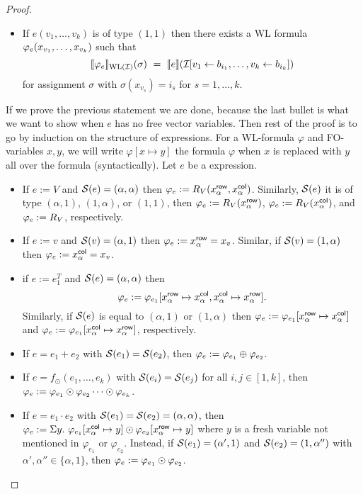 \begin{proof}
\begin{itemize}
	\item If $e(v_1,\ldots,v_k)$ is of type $(1,1)$ then there exists a WL formula $\varphi_e( x_{v_1}, \ldots, x_{v_k})$ such that
	$$
	\ssem{\varphie}{\text{WL}(\I)}(\sigma) \ = \ \sem{e}{\I[v_1\gets b_{i_1},\ldots,v_k\gets b_{i_k}]}
	$$
	for assignment $\sigma$ with $\sigma(x_{v_s})=i_s$ for $s=1,\ldots, k$.
\end{itemize}
If we prove the previous statement we are done, because the last bullet is what we want to show when $e$ has no free vector variables. 
Then rest of the proof is to go by induction on the structure of \langprod expressions.
For a WL-formula $\varphi$ and FO-variables $x,y$, we will write  $\varphi[x \mapsto y]$ the formula $\varphi$ when $x$ is replaced with $y$ all over the formula (syntactically).
Let $e$ be a \langprod expression.
\begin{itemize} \itemsep3mm
  \item If $e:=V$ and $\mathcal{S}(e)= (\alpha, \alpha)$ then $\varphi_e:=R_V(x_{\alpha}^{\mathsf{row}}, x_{\alpha}^{\mathsf{col}})$. Similarly, $\mathcal{S}(e)$ it is of type $(\alpha,1)$, $(1, \alpha)$, or $(1,1)$, then $\varphi_e:=R_V(x_{\alpha}^{\mathsf{row}})$, $\varphi_e:=R_V(x_{\alpha}^{\mathsf{col}})$, and $\varphi_e:=R_V$, respectively.
  
  \item If $e:=v$ and $\mathcal{S}(v)= (\alpha,1)$ then $\varphi_e := x_{\alpha}^{\mathsf{row}} = x_v$. Similar, if $\mathcal{S}(v)= (1,\alpha)$ then $\varphi_e := x_{\alpha}^{\mathsf{col}} = x_v$.
  
  \item if $e:= e_1^T$ and $\mathcal{S}(e)=(\alpha,\alpha)$ then
  $$
  \varphi_e:= \varphi_{e_1}[x_{\alpha}^{\mathsf{row}} \mapsto x_{\alpha}^{\mathsf{col}}, x_{\alpha}^{\mathsf{col}} \mapsto x_{\alpha}^{\mathsf{row}}].
  $$
  Similarly, if $\mathcal{S}(e)$ is equal to $(\alpha,1)$ or $(1,\alpha)$ then $\varphi_e:=\varphi_{e_1}[x_{\alpha}^{\mathsf{row}} \mapsto x_{\alpha}^{\mathsf{col}}]$ and $\varphi_e:=\varphi_{e_1}[x_{\alpha}^{\mathsf{col}} \mapsto x_{\alpha}^{\mathsf{row}}]$, respectively.   


	\item If $e=e_1+e_2$ with $\mathcal{S} (e_1)=\mathcal{S} (e_2)$, then $\varphi_e:= \varphi_{e_1} \oplus \varphi_{e_2}$.
	
	\item If $e=f_\odot(e_1,\ldots, e_k)$ with $\mathcal{S}(e_i)=\mathcal{S}(e_j)$ for all $i,j\in[1,k]$, then $\varphi_e:= \varphi_{e_1} \odot \varphi_{e_2} \cdots \odot \varphi_{e_k}$.
	
	\item If $e=e_1\cdot e_2$ with $\mathcal{S} (e_1)=\mathcal{S} (e_2)=(\alpha, \alpha)$,  then $\varphi_e:= \Sigma y. \  \varphi_{e_1}[x_{\alpha}^{\mathsf{col}} \mapsto y] \odot \varphi_{e_2}[x_{\alpha}^{\mathsf{row}} \mapsto y]$ where $y$ is a fresh variable not mentioned in $\varphi_{e_1}$ or $\varphi_{e_2}$. Instead, if $\mathcal{S} (e_1)= (\alpha', 1)$ and $\mathcal{S} (e_2)=(1, \alpha'')$ with $\alpha', \alpha'' \in \{\alpha, 1\}$, then $\varphi_e := \varphi_{e_1} \odot \varphi_{e_2}$.
	

\end{itemize}
\end{proof}
